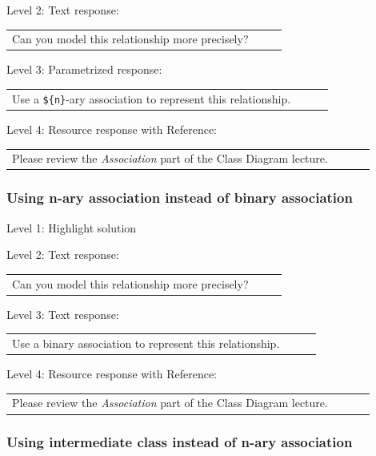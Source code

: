 \noindent Level 2: Text response: \medskip

\begin{tabular}{|p{0.9\linewidth}}
Can you model this relationship more precisely?
\end{tabular} \medskip

\noindent Level 3: Parametrized response: \medskip

\begin{tabular}{|p{0.9\linewidth}}
Use a \verb|${n}|-ary association to represent this relationship.
\end{tabular} \medskip

\noindent Level 4: Resource response with Reference: \medskip

\begin{tabular}{|p{0.9\linewidth}}
Please review the \textit{Association} part of the Class Diagram lecture.
\end{tabular} \medskip


\subsubsection{Using n-ary association instead of binary association}

\noindent Level 1: Highlight solution  \medskip

\noindent Level 2: Text response: \medskip

\begin{tabular}{|p{0.9\linewidth}}
Can you model this relationship more precisely?
\end{tabular} \medskip

\noindent Level 3: Text response: \medskip

\begin{tabular}{|p{0.9\linewidth}}
Use a binary association to represent this relationship.
\end{tabular} \medskip

\noindent Level 4: Resource response with Reference: \medskip

\begin{tabular}{|p{0.9\linewidth}}
Please review the \textit{Association} part of the Class Diagram lecture.
\end{tabular} \medskip


\subsubsection{Using intermediate class instead of n-ary association}

